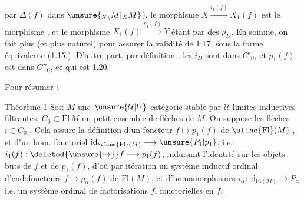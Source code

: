 par $\Delta(f)$ dans $\unsure{{}_{X\backslash}M|{}_X M}$), le morphisme $X\xrightarrow{i_1(f)}X_1(f)$ est le morphisme , et le morphisme $X_1(f)\xrightarrow{p_1(f)}Y$ étant   par  des $p_D$. En somme, on fait  plus  (et  plus naturel) pour assurer la validité de 1.17, sous la forme équivalente (1.15.). D'autre part, par définition , les $i_D$ sont dans $C'_0$, et $p_1(f)$ est dans $C''_0$, ce qui est 1.20.

Pour résumer :

\uline{Théorème 1} Soit $M$ une $\unsure{\mathcal U|U}$-catégorie stable par $\mathcal U$-limites inductives filtrantes, $C_0\subset\mathrm{Fl}\,M$ un petit ensemble de flèches de $M$. On suppose les flèches $i\in C_0$ . Cela assure la  définition d'un foncteur $f\mapsto p_1(f)$ de $\uline{\mathrm{Fl}}(M)$ , et d'un hom. fonctoriel  $\mathrm{id}_{\uline{\mathrm{Fl}}(M)}\longrightarrow\unsure{P_1|p_1}$, i.e. $i_1(f):\deleted{\unsure{\to}}f\longrightarrow p_1(f)$, induisant l'identité sur les objets buts de $f$ et de $p_1(f)$,
d'où par itération un système inductif ordinal d'endofoncteurs $f\mapsto p_\alpha(f)$ de $\mathrm{Fl}(M)$, et  d'homomorphismes $i_\alpha:\mathrm{id}_{\mathrm{Fl}(M)}\longrightarrow P_\alpha$ i.e.
 un système  ordinal de factorisations  $f$, fonctorielles en $f$. 

